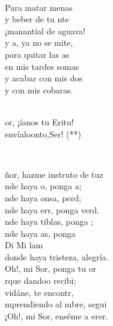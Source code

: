 \documentclass[12pt]{article}
\begin{document}
\begin{multicols*}{2}
\begin{cancion}
\begin{chorus}
	\end{chorus}%
	\jump\\
	Para matar menas\\
	y beber de tu nte\\
	¡manantial de aguava!\\
	y a, ya no se mite, \\
	para quitar las as\\
	en mis tardes somas \\
	y acabar con mis dos\\
	y con mis cobaras.\\\jump\\
	\begin{chorus}%
	or, ¡íanos tu Eritu!   \\
	envíaloonto,Ser! (**)\\
	\end{chorus}%
	\jump\\
\end{cancion}%

\begin{cancion}%
	ñor, hazme instruto de tuz\\
	nde haya o, ponga a;\\
	nde haya onsa, perd;\\
	nde haya err, ponga verd.\\
	nde haya tiblas, ponga ;\\
	nde haya as, ponga   \\
Di             Mi        lam\\
donde haya tristeza, alegría.\\
	Oh!, mi Sor, ponga tu or\\
	rque dandoo recibi; \\
	vidáne, te encontr, \\
	mprendiendo al mbre, segui \\
	¡Oh!, mi Sor, enséme a erer. \\
\end{cancion}%


\end{multicols*}
\end{document}
